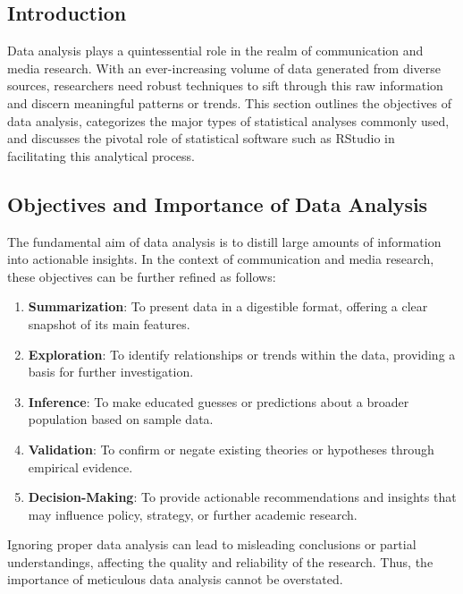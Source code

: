 \documentclass[
  b5paper]{book}
\providecommand{\tightlist}{%
  \setlength{\itemsep}{0pt}\setlength{\parskip}{0pt}}
\begin{document}
\hypertarget{introduction-7}{%
\subsection{Introduction}\label{introduction-7}}

Data analysis plays a quintessential role in the realm of communication and media research. With an ever-increasing volume of data generated from diverse sources, researchers need robust techniques to sift through this raw information and discern meaningful patterns or trends. This section outlines the objectives of data analysis, categorizes the major types of statistical analyses commonly used, and discusses the pivotal role of statistical software such as RStudio in facilitating this analytical process.

\hypertarget{objectives-and-importance-of-data-analysis}{%
\subsection{Objectives and Importance of Data Analysis}\label{objectives-and-importance-of-data-analysis}}

The fundamental aim of data analysis is to distill large amounts of information into actionable insights. In the context of communication and media research, these objectives can be further refined as follows:

\begin{enumerate}
\def\labelenumi{\arabic{enumi}.}
\tightlist
\item
  \textbf{Summarization}: To present data in a digestible format, offering a clear snapshot of its main features.
\item
  \textbf{Exploration}: To identify relationships or trends within the data, providing a basis for further investigation.
\item
  \textbf{Inference}: To make educated guesses or predictions about a broader population based on sample data.
\item
  \textbf{Validation}: To confirm or negate existing theories or hypotheses through empirical evidence.
\item
  \textbf{Decision-Making}: To provide actionable recommendations and insights that may influence policy, strategy, or further academic research.
\end{enumerate}

Ignoring proper data analysis can lead to misleading conclusions or partial understandings, affecting the quality and reliability of the research. Thus, the importance of meticulous data analysis cannot be overstated.
\end{document}
